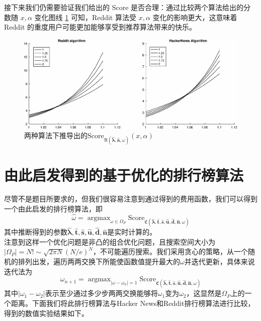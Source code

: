 \documentclass[UTF8]{ctexart}
\theoremstyle{plain}
\theoremstyle{definition}
\theoremstyle{remark}
\DeclareMathOperator*{\argmax}{argmax}
\begin{document}
	接下来我们仍需要验证我们给出的 Score 是否合理：通过比较两个算法给出的分数随 $x, \alpha$ 变化图线 \ref{fig:reddit-h-score} 可知，Reddit 算法受 $x, \alpha$ 变化的影响更大，这意味着 Reddit 的重度用户可能更加能够享受到推荐算法带来的快乐。
	
	\begin{figure}[h!] 
		\centering
		\includegraphics[width = \linewidth]{../model/douhu/pic/reddit-h-score.eps}
		\caption{两种算法下推导出的$\mathrm{Score}_{\mathfrak{A}\left(\bm{\hat{\lambda}}, \bm{\hat{a}}, \omega\right)}(x, \alpha)$}\label{fig:reddit-h-score}
	\end{figure}
	
	\section{由此启发得到的基于优化的排行榜算法}
	尽管不是题目所要求的，但我们很容易注意到通过得到的费用函数，我们可以得到一个由此启发的排行榜算法，即
	\begin{equation}
	\hat{\omega} = \argmax_{\omega \in \Omega_P} \mathrm{Score}_{\mathfrak{C}\left(\bm{\hat{\lambda}}, \bm{\hat{t}}, \bm{\hat{s}}, \bm{\hat{u}}, \bm{\hat{d}}, \bm{\hat{n}},\omega\right)}
	\end{equation}
	其中推断得到的参数$\bm{\hat{\lambda}}, \bm{\hat{t}}, \bm{\hat{s}}, \bm{\hat{u}}, \bm{\hat{d}}, \bm{\hat{n}}$是实时计算的。 \\
	
	注意到这样一个优化问题是非凸的组合优化问题，且搜索空间大小为$|\Omega_P| = N! \sim \sqrt{2\pi N} \left(N/e\right)^N$，不可能遍历搜索。我们采用贪心的策略，从一个随机的排列出发，遍历两两交换下所能使函数值提升最大的$\omega$并迭代更新，具体来说迭代法为
	$$
	\omega_{n+1} =  \argmax_{|\omega - \omega_n| = 1} \mathrm{Score}_{\mathfrak{C}\left(\bm{\hat{\lambda}}, \bm{\hat{t}}, \bm{\hat{s}}, \bm{\hat{u}}, \bm{\hat{d}}, \bm{\hat{n}},\omega\right)}
	$$
	其中$|\omega_1 -\omega_2|$表示至少通过多少步两两交换能够将$\omega_1$变为$\omega_2$，这显然是$\Omega_P$上的一个距离。下面我们将此排行榜算法与Hacker News和Reddit排行榜算法进行比较，得到的数值实验结果如下。
	
\end{document}
